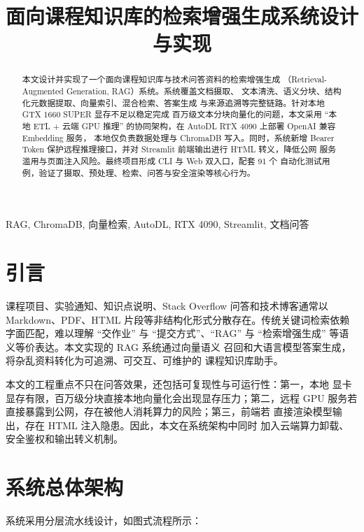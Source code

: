 \documentclass[conference]{IEEEtran}
\begin{document}
\title{面向课程知识库的检索增强生成系统设计与实现}

\author{
}

\maketitle

\begin{abstract}
本文设计并实现了一个面向课程知识库与技术问答资料的检索增强生成
（Retrieval-Augmented Generation, RAG）系统。系统覆盖文档摄取、
文本清洗、语义分块、结构化元数据提取、向量索引、混合检索、答案生成
与来源追溯等完整链路。针对本地 GTX 1660 SUPER 显存不足以稳定完成
百万级文本分块向量化的问题，本文采用 ``本地 ETL + 云端 GPU 推理''
的协同架构，在 AutoDL RTX 4090 上部署 OpenAI 兼容 Embedding 服务，
本地仅负责数据处理与 ChromaDB 写入。同时，系统新增 Bearer Token
保护远程推理接口，并对 Streamlit 前端输出进行 HTML 转义，降低公网
服务滥用与页面注入风险。最终项目形成 CLI 与 Web 双入口，配套 91 个
自动化测试用例，验证了摄取、预处理、检索、问答与安全渲染等核心行为。
\end{abstract}

\begin{IEEEkeywords}
RAG, ChromaDB, 向量检索, AutoDL, RTX 4090, Streamlit, 文档问答
\end{IEEEkeywords}

\section{引言}
课程项目、实验通知、知识点说明、Stack Overflow 问答和技术博客通常以
Markdown、PDF、HTML 片段等非结构化形式分散存在。传统关键词检索依赖
字面匹配，难以理解 ``交作业'' 与 ``提交方式''、``RAG'' 与
``检索增强生成'' 等语义等价表达。本文实现的 RAG 系统通过向量语义
召回和大语言模型答案生成，将杂乱资料转化为可追溯、可交互、可维护的
课程知识库助手。

本文的工程重点不只在问答效果，还包括可复现性与可运行性：第一，本地
显卡显存有限，百万级分块直接本地向量化会出现显存压力；第二，远程
GPU 服务若直接暴露到公网，存在被他人消耗算力的风险；第三，前端若
直接渲染模型输出，存在 HTML 注入隐患。因此，本文在系统架构中同时
加入云端算力卸载、安全鉴权和输出转义机制。

\section{系统总体架构}
系统采用分层流水线设计，如图式流程所示：
\end{document}
